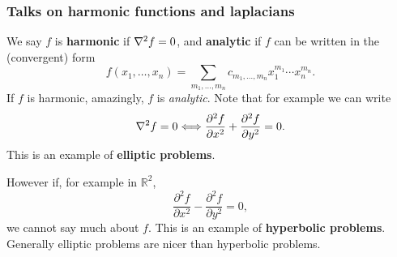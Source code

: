 \subsubsection*{Talks on harmonic functions and laplacians}
We say $f$ is \textbf{harmonic} if $ \laplacian f=0 $, and \textbf{analytic} if $f$ can be written in the (convergent) form 
\[
    f(x_1,\dots,x_n)=\sum_{m_1,\dots,m_n} c_{m_1,\dots,m_n}x_1^{m_1}\cdots x_n^{m_n}.
\]
If $f$ is harmonic, amazingly, $f$ is \textit{analytic}. Note that for example we can write 
\[
    \laplacian f = 0 \Longleftrightarrow \frac{\partial ^2 f}{\partial x^2}+\frac{\partial ^2 f}{\partial y^2}=0.
\]
This is an example of \textbf{elliptic problems}.

However if, for example in $ \mathbb{R}^{2} $,
\[
    \frac{\partial ^2 f}{\partial x^2}-\frac{\partial ^2 f}{\partial y^2}=0,  
\]
we cannot say much about $f$. This is an example of \textbf{hyperbolic problems}. Generally elliptic problems are nicer than hyperbolic problems.